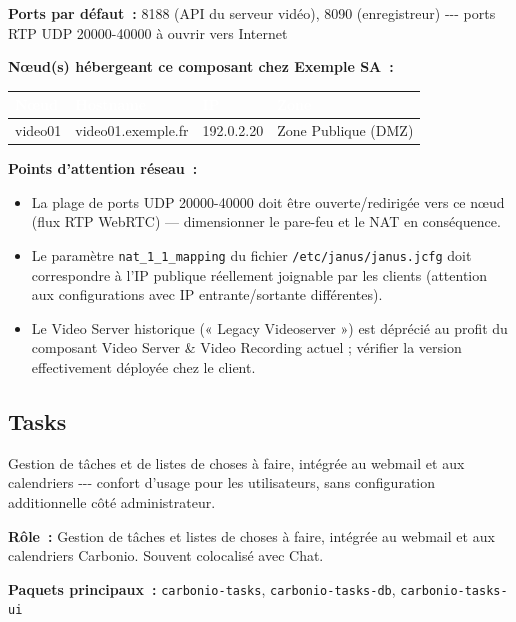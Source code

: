 \documentclass[11pt,a4paper]{report}
\newcommand{\tblhead}[1]{\textcolor{white}{\textbf{#1}}}
\begin{document}
\textbf{Ports par défaut~:} 8188 (API du serveur vidéo), 8090 (enregistreur) -\allowbreak{}-\allowbreak{}-\allowbreak{} ports RTP UDP 20000-\allowbreak{}40000 à ouvrir vers Internet

\textbf{Nœud(s) hébergeant ce composant chez Exemple SA~:}
\begin{longtable}{|p{3.2cm}|p{4.5cm}|p{3.2cm}|p{2.3cm}|}
\hline
\rowcolor{primary}\tblhead{Nœud} & \tblhead{Hostname} & \tblhead{IP} & \tblhead{Zone} \\
\hline
\endhead
video01 & video01.\allowbreak{}exemple.\allowbreak{}fr & 192.\allowbreak{}0.\allowbreak{}2.\allowbreak{}20 & Zone Publique (DMZ) \\
\hline
\end{longtable}

\textbf{Points d'attention réseau~:}
\begin{itemize}[nosep]
  \item La plage de ports UDP 20000-40000 doit être ouverte/redirigée vers ce nœud (flux RTP WebRTC) --- dimensionner le pare-feu et le NAT en conséquence.
  \item Le paramètre \texttt{nat\_1\_1\_mapping} du fichier \texttt{/etc/janus/janus.jcfg} doit correspondre à l'IP publique réellement joignable par les clients (attention aux configurations avec IP entrante/sortante différentes).
  \item Le Video Server historique (« Legacy Videoserver ») est déprécié au profit du composant Video Server \& Video Recording actuel ; vérifier la version effectivement déployée chez le client.
\end{itemize}

\subsection{Tasks}

Gestion de tâches et de listes de choses à faire, intégrée au webmail et aux calendriers -\allowbreak{}-\allowbreak{}-\allowbreak{} confort d'usage pour les utilisateurs, sans configuration additionnelle côté administrateur.\allowbreak{}

\textbf{Rôle~:} Gestion de tâches et listes de choses à faire, intégrée au webmail et aux calendriers Carbonio.\allowbreak{} Souvent colocalisé avec Chat.\allowbreak{}

\textbf{Paquets principaux~:} \texttt{carbonio-\allowbreak{}tasks}, \texttt{carbonio-\allowbreak{}tasks-\allowbreak{}db}, \texttt{carbonio-\allowbreak{}tasks-\allowbreak{}ui}
\end{document}
